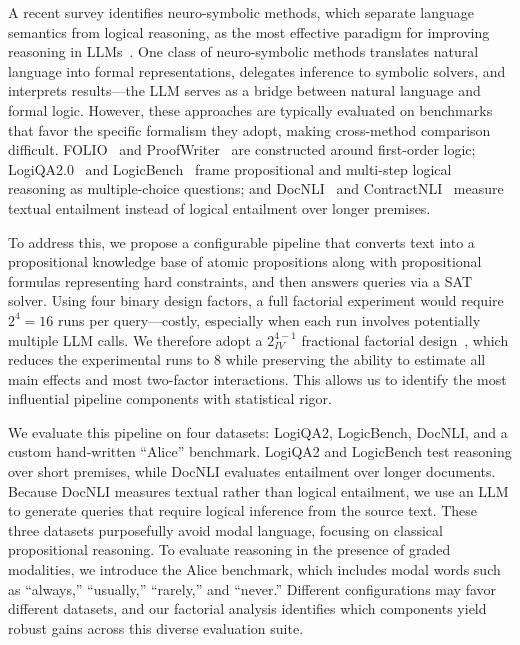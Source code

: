 \documentclass{article} %
\begin{document}
A recent survey identifies neuro-symbolic methods, which separate language semantics from logical reasoning, as the most effective paradigm for improving reasoning in LLMs~\citep{yang2025neurosymbolic}. One class of neuro-symbolic methods translates natural language into formal representations, delegates inference to symbolic solvers, and interprets results---the LLM serves as a bridge between natural language and formal logic. However, these approaches are typically evaluated on benchmarks that favor the specific formalism they adopt, making cross-method comparison difficult. FOLIO~\citep{han2022folio} and ProofWriter~\citep{tafjord2021proofwriter} are constructed around first-order logic; LogiQA2.0~\citep{liu2023logiqa2} and LogicBench~\citep{parmar2024logicbench} frame propositional and multi-step logical reasoning as multiple-choice questions; and DocNLI~\citep{yin2021docnli} and ContractNLI~\citep{koreeda2021contractnli} measure textual entailment instead of logical entailment over longer premises.

To address this, we propose a configurable pipeline that converts text into a propositional knowledge base of atomic propositions along with propositional formulas representing hard constraints, and then answers queries via a SAT solver. Using four binary design factors, a full factorial experiment would require $2^4 = 16$ runs per query---costly, especially when each run involves potentially multiple LLM calls. We therefore adopt a $2^{4-1}_{IV}$ fractional factorial design~\citep{box2005statistics}, which reduces the experimental runs to 8 while preserving the ability to estimate all main effects and most two-factor interactions.
This allows us to identify the most influential pipeline components with statistical rigor.

We evaluate this pipeline on four datasets: LogiQA2, LogicBench, DocNLI, and a custom hand-written ``Alice'' benchmark. LogiQA2 and LogicBench test reasoning over short premises, while DocNLI evaluates entailment over longer documents. Because DocNLI measures textual rather than logical entailment, we use an LLM to generate queries that require logical inference from the source text. These three datasets purposefully avoid modal language, focusing on classical propositional reasoning. To evaluate reasoning in the presence of graded modalities, we introduce the Alice benchmark, which includes modal words such as ``always,'' ``usually,'' ``rarely,'' and ``never.'' Different configurations may favor different datasets, and our factorial analysis identifies which components yield robust gains across this diverse evaluation suite.
\end{document}
